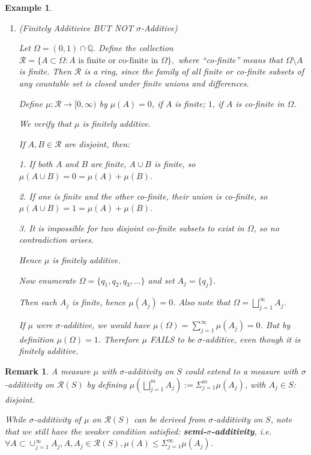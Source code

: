 \documentclass[12pt]{article}
\theoremstyle{blueplain}
\theoremstyle{bluedef}
\theoremstyle{blueremark}
\newtheorem{remark}{Remark}[section]
\newtheorem{example}{Example}[section]
\numberwithin{equation}{section}
\begin{document}
\begin{example}
\begin{enumerate}
\begin{proof}
            Combining above, $\mu(A) = \mu(A_m^{(1)}) + \mu(A_m^{(2)}) le \sum_{j=1}^{\infty} \mu(A_j) + \mu(A_m^{(2)})$, and letting $m \to \infty$ gives $\mu(A) \le \sum_{j=1}^{\infty} \mu(A_j)$. $\checkmark$
          \end{proof}
    \item (Finitely Additivive BUT NOT $\sigma$-Additive)

          Let $\Omega = (0,1) \cap \mathbb{Q}.$
          Define the collection $\mathcal{R} = \{A \subset \Omega : A \text{ is finite or co-finite in } \Omega\},$ where “co-finite” means that $\Omega \setminus A$ is finite. Then $\mathcal{R}$ is a ring, since the family of all finite or co-finite subsets of any countable set is closed under finite unions and differences.

          Define $\mu : \mathcal{R} \to [0,\infty)$ by $\mu(A) = 0$, if $A$ is finite; $1$, if $A$ is co-finite in $\Omega$.

          We verify that $\mu$ is finitely additive.

          If $A,B\in\mathcal{R}$ are disjoint, then:

          1.	If both $A$ and $B$ are finite, $A\cup B$ is finite, so $\mu(A\cup B)=0=\mu(A)+\mu(B).$

          2.	If one is finite and the other co-finite, their union is co-finite, so $\mu(A\cup B)=1=\mu(A)+\mu(B).$

          3.	It is impossible for two disjoint co-finite subsets to exist in $\Omega$, so no contradiction arises.

          Hence $\mu$ is finitely additive.

          Now enumerate $\Omega = \{q_1,q_2,q_3,\dots\}$ and set $A_j = \{q_j\}$.

          Then each $A_j$ is finite, hence $\mu(A_j)=0$. Also note that $\Omega = \bigsqcup_{j=1}^{\infty} A_j$.

          If $\mu$ were $\sigma$-additive, we would have $\mu(\Omega) = \sum_{j=1}^{\infty} \mu(A_j) = 0$.
          But by definition $\mu(\Omega)=1$. Therefore $\mu$ FAILS to be $\sigma$-additive, even though it is finitely additive.
  \end{enumerate}
\end{example}

\begin{remark}
  A measure $\mu$ with $\sigma$-additivity on $S$ could extend to a measure with $\sigma$-additivity on $\mathcal{R}(S)$ by defining $\mu\left( \bigsqcup_{j=1}^m A_j \right) := \Sigma_{j=1}^m \mu(A_j)$, with $A_j \in S$: disjoint.

  While $\sigma$-additivity of $\mu$ on $\mathcal{R}(S)$ can be derived from $\sigma$-additivity on $S$, note that we still have the weaker condition satisfied: \textbf{semi-$\sigma$-additivity}, i.e. $\forall A \subset \cup_{j=1}^\infty A_j, A, A_j \in \mathcal{R}(S), \mu(A) \leq \Sigma_{j=1}^\infty \mu(A_j)$.
\end{remark}
\end{document}
